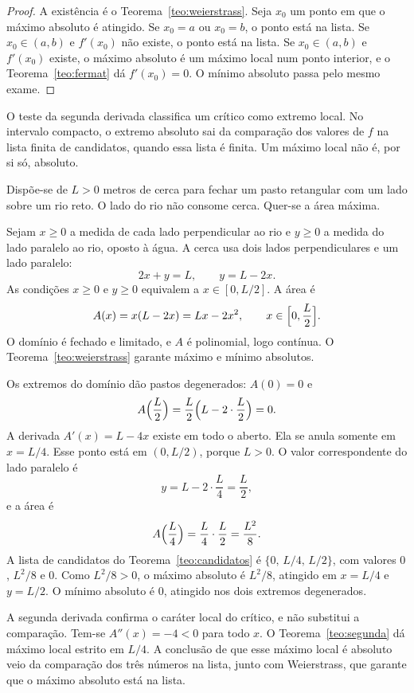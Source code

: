 \documentclass[11pt,a4paper]{article}
\begin{document}
\begin{proof}
A existência é o Teorema~\ref{teo:weierstrass}. Seja $x_0$ um ponto em que o máximo absoluto é atingido. Se $x_0=a$ ou $x_0=b$, o ponto está na lista. Se $x_0\in(a,b)$ e $f'(x_0)$ não existe, o ponto está na lista. Se $x_0\in(a,b)$ e $f'(x_0)$ existe, o máximo absoluto é um máximo local num ponto interior, e o Teorema~\ref{teo:fermat} dá $f'(x_0)=0$. O mínimo absoluto passa pelo mesmo exame.
\end{proof}

O teste da segunda derivada classifica um crítico como extremo local. No intervalo compacto, o extremo absoluto sai da comparação dos valores de $f$ na lista finita de candidatos, quando essa lista é finita. Um máximo local não é, por si só, absoluto.

\begin{exemplo}
Dispõe-se de $L>0$ metros de cerca para fechar um pasto retangular com um lado sobre um rio reto. O lado do rio não consome cerca. Quer-se a área máxima.

Sejam $x\ge 0$ a medida de cada lado perpendicular ao rio e $y\ge 0$ a medida do lado paralelo ao rio, oposto à água. A cerca usa dois lados perpendiculares e um lado paralelo:
\[
2x+y=L,\qquad y=L-2x.
\]
As condições $x\ge 0$ e $y\ge 0$ equivalem a $x\in[0,L/2]$. A área é
\[
A(x)=x(L-2x)=Lx-2x^2,\qquad x\in\Bigl[0,\frac{L}{2}\Bigr].
\]
O domínio é fechado e limitado, e $A$ é polinomial, logo contínua. O Teorema~\ref{teo:weierstrass} garante máximo e mínimo absolutos.

Os extremos do domínio dão pastos degenerados: $A(0)=0$ e
\[
A\Bigl(\frac{L}{2}\Bigr)=\frac{L}{2}\Bigl(L-2\cdot\frac{L}{2}\Bigr)=0.
\]
A derivada $A'(x)=L-4x$ existe em todo o aberto. Ela se anula somente em $x=L/4$. Esse ponto está em $(0,L/2)$, porque $L>0$. O valor correspondente do lado paralelo é
\[
y=L-2\cdot\frac{L}{4}=\frac{L}{2},
\]
e a área é
\[
A\Bigl(\frac{L}{4}\Bigr)=\frac{L}{4}\cdot\frac{L}{2}=\frac{L^2}{8}.
\]
A lista de candidatos do Teorema~\ref{teo:candidatos} é $\{0,\,L/4,\,L/2\}$, com valores $0$, $L^2/8$ e $0$. Como $L^2/8>0$, o máximo absoluto é $L^2/8$, atingido em $x=L/4$ e $y=L/2$. O mínimo absoluto é $0$, atingido nos dois extremos degenerados.

A segunda derivada confirma o caráter local do crítico, e não substitui a comparação. Tem-se $A''(x)=-4<0$ para todo $x$. O Teorema~\ref{teo:segunda} dá máximo local estrito em $L/4$. A conclusão de que esse máximo local é absoluto veio da comparação dos três números na lista, junto com Weierstrass, que garante que o máximo absoluto está na lista.
\end{exemplo}
\end{document}
